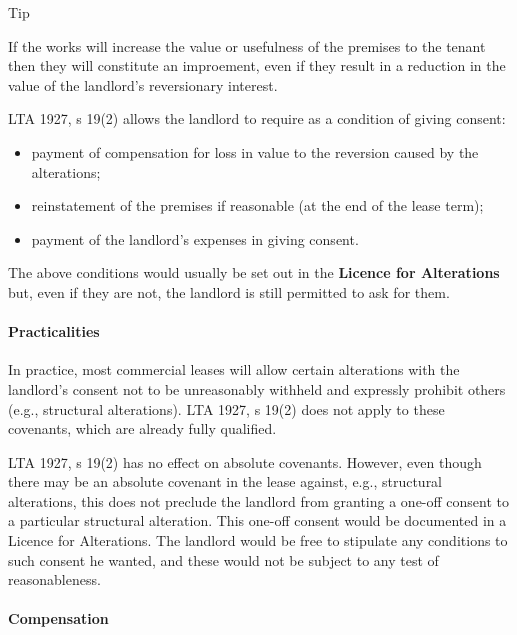 \documentclass[
]{article}
\providecommand{\tightlist}{%
  \setlength{\itemsep}{0pt}\setlength{\parskip}{0pt}}
\newenvironment{env-b23dd66a-8a6c-447d-a163-3614469799d6}
{
    \savenotes\tcolorbox[blanker,breakable,left=5pt,borderline west={2pt}{-4pt}{cyan}]
}
{
    \endtcolorbox\spewnotes
}
\begin{document}
\begin{env-b23dd66a-8a6c-447d-a163-3614469799d6}

Tip

If the works will increase the value or usefulness of the premises to
the tenant then they will constitute an improement, even if they result
in a reduction in the value of the landlord's reversionary interest.

\end{env-b23dd66a-8a6c-447d-a163-3614469799d6}

LTA 1927, s 19(2) allows the landlord to require as a condition of
giving consent:

\begin{itemize}
\tightlist
\item
  payment of compensation for loss in value to the reversion caused by
  the alterations;
\item
  reinstatement of the premises if reasonable (at the end of the lease
  term);
\item
  payment of the landlord's expenses in giving consent.
\end{itemize}

The above conditions would usually be set out in the \textbf{Licence for
Alterations} but, even if they are not, the landlord is still permitted
to ask for them.

\hypertarget{practicalities}{%
\paragraph{Practicalities}\label{practicalities}}

In practice, most commercial leases will allow certain alterations with
the landlord's consent not to be unreasonably withheld and expressly
prohibit others (e.g., structural alterations). LTA 1927, s 19(2) does
not apply to these covenants, which are already fully qualified.

LTA 1927, s 19(2) has no effect on absolute covenants. However, even
though there may be an absolute covenant in the lease against, e.g.,
structural alterations, this does not preclude the landlord from
granting a one-off consent to a particular structural alteration. This
one-off consent would be documented in a Licence for Alterations. The
landlord would be free to stipulate any conditions to such consent he
wanted, and these would not be subject to any test of reasonableness.

\hypertarget{compensation}{%
\paragraph{Compensation}\label{compensation}}
\end{document}
